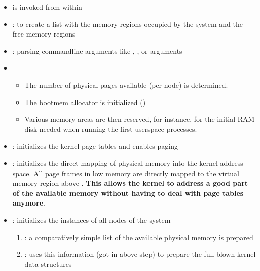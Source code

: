 \begin{itemize}
\item {} is invoked from within 
\item {}: to create a list with the memory regions occupied by
the system and the free memory regions
\item {}: parsing commandline arguments like , , or  arguments
\item {}
  \begin{itemize}
  \item The number of physical pages available (per node) is determined.
  \item The bootmem allocator is initialized (\cite[Sec 3.4.3]{mauerer2008professional})
  \item Various memory areas are then reserved, for instance, for the initial RAM disk needed when
   running the first userspace processes.
  \end{itemize}
\item {}: initializes the kernel page tables and enables paging
\item {}: initializes the direct mapping of physical memory into the
  kernel address space. All page frames in low memory are directly mapped to the virtual
  memory region above . \textbf{This allows the kernel to address a
    good part of the available memory without having to deal with page tables anymore}.
\item {}: initializes the  instances of all nodes of
  the system
  \begin{enumerate}
  \item {}: a comparatively simple list of the available physical
    memory is prepared
  \item {}: uses this information (got in above step) to
    prepare the full-blown kernel data structures
  \end{enumerate}
\end{itemize}

